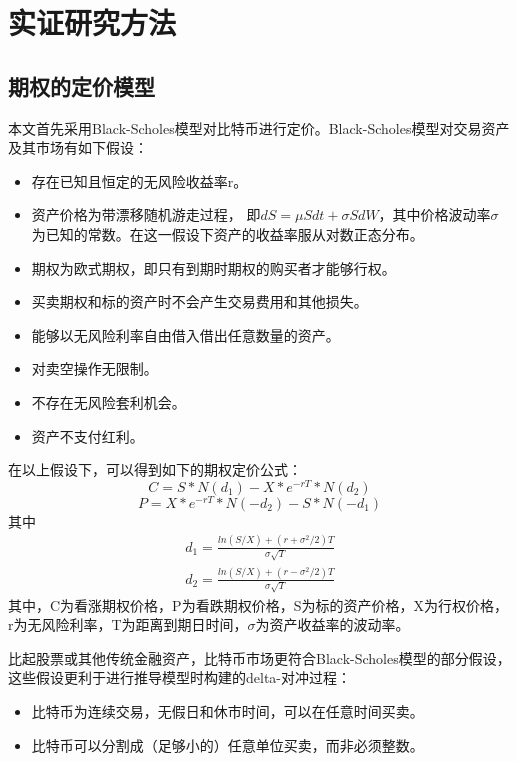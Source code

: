 \chapter{实证研究方法}\label{research_method}
    \section{期权的定价模型}
    本文首先采用Black-Scholes模型对比特币进行定价。Black-Scholes模型对交易资产及其市场有如下假设：
    \begin{itemize}
        \item 存在已知且恒定的无风险收益率r。
        \item 资产价格为带漂移随机游走过程， 即$dS={\mu}Sdt+{\sigma}SdW$，其中价格波动率$\sigma$为已知的常数。在这一假设下资产的收益率服从对数正态分布。
        \item 期权为欧式期权，即只有到期时期权的购买者才能够行权。
        \item 买卖期权和标的资产时不会产生交易费用和其他损失。
        \item 能够以无风险利率自由借入借出任意数量的资产。
        \item 对卖空操作无限制。
        \item 不存在无风险套利机会。
        \item 资产不支付红利。
    \end{itemize}
    在以上假设下，可以得到如下的期权定价公式：
    \begin{equation}\label{bs-call}
            C=S*N(d_1)-X*e^{-rT}*N(d_2) 
    \end{equation}
    \begin{equation}\label{bs-put}
        P=X*e^{-rT}*N(-d_2)-S*N(-d_1)
    \end{equation}
    其中
    \begin{equation*}
        \begin{split}
        d_1=\frac{ln(S/X)+(r+\sigma^2/2)T}{\sigma{\sqrt{T}}} \\
        d_2=\frac{ln(S/X)+(r-\sigma^2/2)T}{\sigma{\sqrt{T}}}
        \end{split}
    \end{equation*}
    其中，C为看涨期权价格，P为看跌期权价格，S为标的资产价格，X为行权价格，r为无风险利率，T为距离到期日时间，$\sigma$为资产收益率的波动率。
    
    比起股票或其他传统金融资产，比特币市场更符合Black-Scholes模型的部分假设，这些假设更利于进行推导模型时构建的delta-对冲过程：
        \begin{itemize}
            \item 比特币为连续交易，无假日和休市时间，可以在任意时间买卖。
            \item 比特币可以分割成（足够小的）任意单位买卖，而非必须整数。
        \end{itemize}
    
